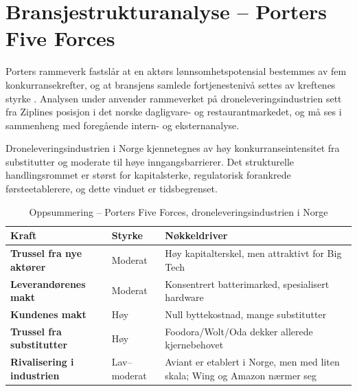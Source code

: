 \documentclass[12pt, a4paper]{article}
\begin{document}

\section{Bransjestrukturanalyse – Porters Five Forces}

Porters rammeverk fastslår at en aktørs lønnsomhetspotensial bestemmes av fem
konkurransekrefter, og at bransjens samlede fortjenestenivå settes av
kreftenes styrke
\parencite[35]{porter1980}. Analysen under anvender rammeverket på
droneleveringsindustrien sett fra Ziplines posisjon i det norske dagligvare-%
og restaurantmarkedet, og må ses i sammenheng med foregående intern- og
eksternanalyse.

Droneleveringsindustrien i Norge kjennetegnes av høy konkurranseintensitet
fra substitutter og moderate til høye inngangsbarrierer. Det strukturelle
handlingsrommet er størst for kapitalsterke, regulatorisk forankrede
førsteetablerere, og dette vinduet er tidsbegrenset.

\begin{table}[h!]
\centering
\caption{Oppsummering – Porters Five Forces, droneleveringsindustrien i Norge}
\label{tab:five_forces}
\renewcommand{\arraystretch}{1.4}
\begin{tabularx}{\textwidth}{
  >{\bfseries}p{5.2cm}
  >{\centering\arraybackslash}p{2.5cm}
  X
}
\toprule
\rowcolor{tableheader}\color{white}Kraft &
  \color{white}Styrke &
  \color{white}Nøkkeldriver \\
\midrule
\rowcolor{tablerow}
Trussel fra nye aktører    & \cellcolor{medorange} Moderat    & Høy
kapitalterskel, men attraktivt for Big Tech \\
Leverandørenes makt        & \cellcolor{medorange} Moderat    & Konsentrert
batterimarked, spesialisert hardware \\
\rowcolor{tablerow}
Kundenes makt              & \cellcolor{highred}   Høy        & Null
byttekostnad, mange substitutter \\
Trussel fra substitutter   & \cellcolor{highred}   Høy        &
Foodora/Wolt/Oda dekker allerede kjernebehovet \\
\rowcolor{tablerow}
Rivalisering i industrien  & \cellcolor{lowgreen}  Lav–moderat  & Aviant er
etablert i Norge, men med liten skala; Wing og Amazon nærmer seg \\
\bottomrule
\end{tabularx}
\end{table}
\end{document}
